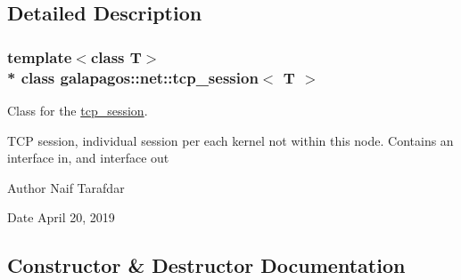 \subsection{Detailed Description}
\subsubsection*{template$<$class T$>$\\*
class galapagos\+::net\+::tcp\+\_\+session$<$ T $>$}

Class for the \hyperlink{classgalapagos_1_1net_1_1tcp__session}{tcp\+\_\+session}. 

T\+CP session, individual session per each kernel not within this node. Contains an interface in, and interface out \begin{DoxyAuthor}{Author}
Naif Tarafdar 
\end{DoxyAuthor}
\begin{DoxyDate}{Date}
April 20, 2019 
\end{DoxyDate}


\subsection{Constructor \& Destructor Documentation}
